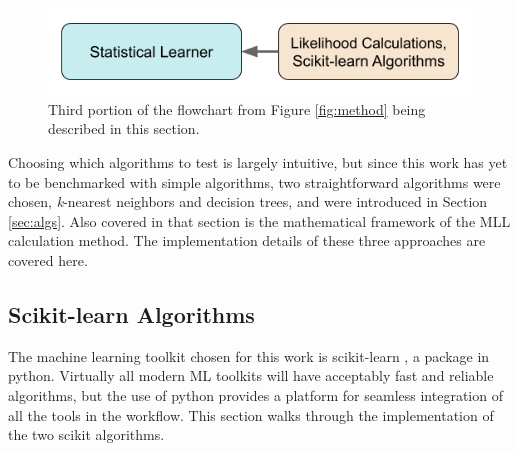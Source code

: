 
\begin{figure}[H]
  \centering
  \includegraphics[width=0.7\linewidth]{./chapters/exp1/methodology3.png}
  \caption{Third portion of the flowchart from Figure \ref{fig:method} being 
           described in this section.}
\end{figure}

Choosing which algorithms to test is largely intuitive, but since this work has
yet to be benchmarked with simple algorithms, two straightforward algorithms
were chosen, \textit{k}-nearest neighbors and decision trees, and were
introduced in Section \ref{sec:algs}. Also covered in that section is the
mathematical framework of the \gls{MLL} calculation method. The implementation
details of these three approaches are covered here. 

\subsection{Scikit-learn Algorithms}

The machine learning toolkit chosen for this work is scikit-learn
\cite{scikit}, a package in python.  Virtually all modern \gls{ML} toolkits
will have acceptably fast and reliable algorithms, but the use of python
provides a platform for seamless integration of all the tools in the workflow.
This section walks through the implementation of the two scikit algorithms. 


